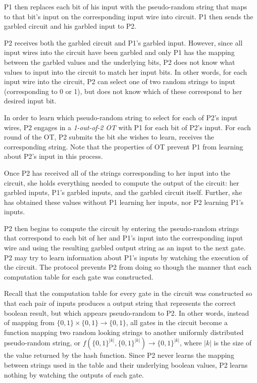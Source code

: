 \ac{P1} then replaces each bit of his input with the pseudo-random string that maps to that bit's input on the corresponding input wire into circuit. \ac{P1} then sends the garbled circuit and his garbled input to \ac{P2}.

\ac{P2} receives both the garbled circuit and \ac{P1}'s garbled input. However, since all input wires into the circuit have been garbled and only \ac{P1} has the mapping between the garbled values and the underlying bits, \ac{P2} does not know what values to input into the circuit to match her input bits. In other words, for each input wire into the circuit, \ac{P2} can select one of two random strings to input (corresponding to 0 or 1), but does not know which of these correspond to her desired input bit.

In order to learn which pseudo-random string to select for each of \ac{P2}'s input wires, \ac{P2} engages in a \emph{1-out-of-2 \ac{OT}} with \ac{P1} for each bit of \ac{P2}'s input. For each round of the \ac{OT}, \ac{P2} submits the bit she wishes to learn, receives the corresponding string.  Note that the properties of \ac{OT} prevent \ac{P1} from learning about \ac{P2}'s input in this process.

Once \ac{P2} has received all of the strings corresponding to her input into the circuit, she holds everything needed to compute the output of the circuit: her garbled inputs, \ac{P1}'s garbled inputs, and the garbled circuit itself. Further, she has obtained these values without \ac{P1} learning her inputs, nor \ac{P2} learning \ac{P1}'s inputs.

\ac{P2} then begins to compute the circuit by entering the pseudo-random strings that correspond to each bit of her and \ac{P1}'s input into the corresponding input wire and using the resulting garbled output string as an input to the next gate. \ac{P2} may try to learn information about \ac{P1}'s inputs by watching the execution of the circuit. The protocol prevents \ac{P2} from doing so though the manner that each computation table for each gate was constructed.

Recall that the computation table for every gate in the circuit was constructed so that each pair of inputs produces a output string that represents the correct boolean result, but which appears pseudo-random to \ac{P2}.  In other words, instead of mapping from $\{0, 1\} \times \{0, 1\} \to \{0, 1\}$, all gates in the circuit become a function mapping two random looking strings to another uniformly distributed pseudo-random string, or $f(\{0, 1\}^{|k|}, \{0, 1\}^{|k|}) \to \{0, 1\}^{|k|}$, where $|k|$ is the size of the value returned by the hash function. Since \ac{P2} never learns the mapping between strings used in the table and their underlying boolean values, \ac{P2} learns nothing by watching the outputs of each gate.

